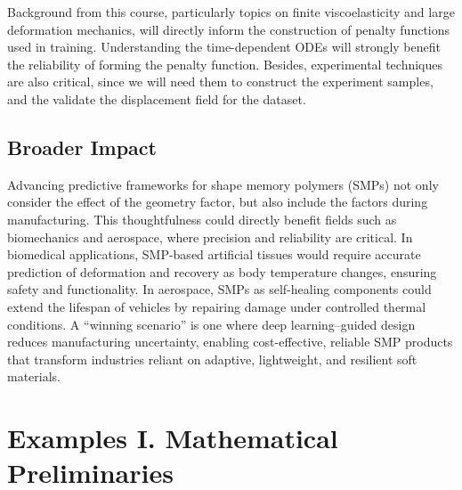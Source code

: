 \documentclass{elsarticle}
\begin{document}
Background from this course, particularly topics on finite viscoelasticity and large deformation mechanics, will directly inform the construction of penalty functions used in training. Understanding the time-dependent ODEs will strongly benefit the reliability of forming the penalty function. Besides, experimental techniques are also critical, since we will need them to construct the experiment samples, and the validate the displacement field for the dataset.

\subsection{Broader Impact}
Advancing predictive frameworks for shape memory polymers (SMPs) not only consider the effect of the geometry factor, but also include the factors during manufacturing. This thoughtfulness could directly benefit fields such as biomechanics and aerospace, where precision and reliability are critical. In biomedical applications, SMP-based artificial tissues would require accurate prediction of deformation and recovery as body temperature changes, ensuring safety and functionality. In aerospace, SMPs as self-healing components could extend the lifespan of vehicles by repairing damage under controlled thermal conditions. A “winning scenario” is one where deep learning–guided design reduces manufacturing uncertainty, enabling cost-effective, reliable SMP products that transform industries reliant on adaptive, lightweight, and resilient soft materials.
\newpage
\section{Examples I. Mathematical Preliminaries}
\end{document}
